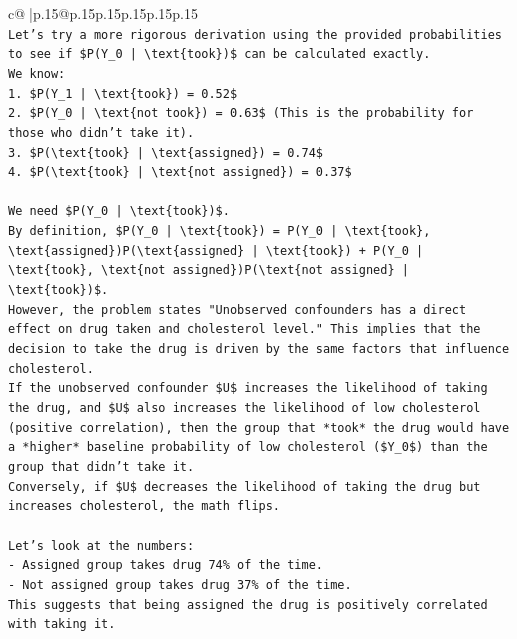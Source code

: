 \documentclass{article}
\begin{document}
{\begin{supertabular}{c@{$\;$}|p{.15\linewidth}@{}p{.15\linewidth}p{.15\linewidth}p{.15\linewidth}p{.15\linewidth}p{.15\linewidth}}
{{{\\ 
\texttt{Let's try a more rigorous derivation using the provided probabilities to see if \$P(Y\_0 | \textbackslash{}text\{took\})\$ can be calculated exactly.} \\
\texttt{We know:} \\
\texttt{1. \$P(Y\_1 | \textbackslash{}text\{took\}) = 0.52\$} \\
\texttt{2. \$P(Y\_0 | \textbackslash{}text\{not took\}) = 0.63\$ (This is the probability for those who didn't take it).} \\
\texttt{3. \$P(\textbackslash{}text\{took\} | \textbackslash{}text\{assigned\}) = 0.74\$} \\
\texttt{4. \$P(\textbackslash{}text\{took\} | \textbackslash{}text\{not assigned\}) = 0.37\$} \\
\\ 
\texttt{We need \$P(Y\_0 | \textbackslash{}text\{took\})\$.} \\
\texttt{By definition, \$P(Y\_0 | \textbackslash{}text\{took\}) = P(Y\_0 | \textbackslash{}text\{took\}, \textbackslash{}text\{assigned\})P(\textbackslash{}text\{assigned\} | \textbackslash{}text\{took\}) + P(Y\_0 | \textbackslash{}text\{took\}, \textbackslash{}text\{not assigned\})P(\textbackslash{}text\{not assigned\} | \textbackslash{}text\{took\})\$.} \\
\texttt{However, the problem states "Unobserved confounders has a direct effect on drug taken and cholesterol level." This implies that the decision to take the drug is driven by the same factors that influence cholesterol.} \\
\texttt{If the unobserved confounder \$U\$ increases the likelihood of taking the drug, and \$U\$ also increases the likelihood of low cholesterol (positive correlation), then the group that *took* the drug would have a *higher* baseline probability of low cholesterol (\$Y\_0\$) than the group that didn't take it.} \\
\texttt{Conversely, if \$U\$ decreases the likelihood of taking the drug but increases cholesterol, the math flips.} \\
\\ 
\texttt{Let's look at the numbers:} \\
\texttt{{-} Assigned group takes drug 74\% of the time.} \\
\texttt{{-} Not assigned group takes drug 37\% of the time.} \\
\texttt{This suggests that being assigned the drug is positively correlated with taking it.} \\
}}}
\end{supertabular}}
\end{document}
